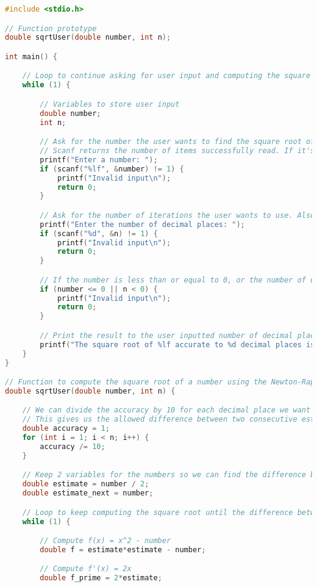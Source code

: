 \documentclass[12pt,letterpaper]{article}
\begin{document}
\begin{lstlisting}[language=c, breaklines=true]
#include <stdio.h>

// Function prototype
double sqrtUser(double number, int n);

int main() {

	// Loop to continue asking for user input and computing the square root
	while (1) {

		// Variables to store user input
		double number;
		int n;

		// Ask for the number the user wants to find the square root of. Also check and make sure it's a number
		// Scanf returns the number of items successfully read. If it's not 1, then the user didn't enter a number and we can exit the program.
		printf("Enter a number: ");
		if (scanf("%lf", &number) != 1) {
			printf("Invalid input\n");
			return 0;
		}

		// Ask for the number of iterations the user wants to use. Also check and make sure it's a number.
		printf("Enter the number of decimal places: ");
		if (scanf("%d", &n) != 1) {
			printf("Invalid input\n");
			return 0;
		}

		// If the number is less than or equal to 0, or the number of decimal places is less than 0, then the input is invalid.
		if (number <= 0 || n < 0) {
			printf("Invalid input\n");
			return 0;
		}

		// Print the result to the user inputted number of decimal places.
		printf("The square root of %lf accurate to %d decimal places is %.*lf\n\n", number, n, n, sqrtUser(number, n));
	}
}

// Function to compute the square root of a number using the Newton-Raphson method
double sqrtUser(double number, int n) {

	// We can divide the accuracy by 10 for each decimal place we want to find
	// This gives us the allowed difference between two consecutive estimates
	double accuracy = 1;
	for (int i = 1; i < n; i++) {
		accuracy /= 10;
	}

	// Keep 2 variables for the numbers so we can find the difference between them
	double estimate = number / 2; 
	double estimate_next = number;

	// Loop to keep computing the square root until the difference between the two estimates is less than the accuracy
	while (1) {

		// Compute f(x) = x^2 - number
		double f = estimate*estimate - number;

		// Compute f'(x) = 2x
		double f_prime = 2*estimate;


\end{lstlisting}
\end{document}
